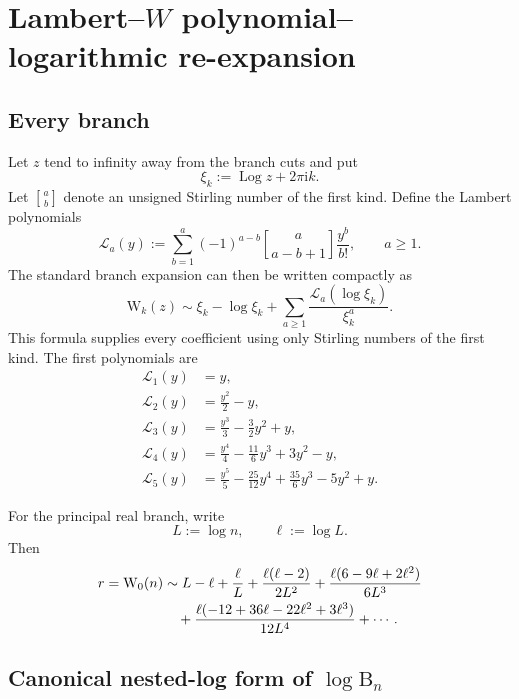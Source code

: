\documentclass[11pt,a4paper]{article}
\theoremstyle{definition}
\newcommand{\Bell}{\mathrm B}
\newcommand{\W}{\mathrm W}
\newcommand{\ii}{\mathrm i}
\newcommand{\cL}{\mathcal L}
\newcommand{\Log}{\operatorname{Log}}
\newcommand{\Sone}[2]{\genfrac{[}{]}{0pt}{}{#1}{#2}}
\begin{document}
\section{Lambert--\texorpdfstring{$W$}{W} polynomial--logarithmic re-expansion}

\subsection{Every branch}

Let $z$ tend to infinity away from the branch cuts and put
\begin{equation}\label{eq:xi-k}
 \xi_k:=\Log z+2\pi\ii k.
\end{equation}
Let $\Sone{a}{b}$ denote an unsigned Stirling number of the first
kind.  Define the Lambert polynomials
\begin{equation}\label{eq:Lambert-polynomials}
 \cL_a(y):=\sum_{b=1}^{a}(-1)^{a-b}
 \Sone{a}{a-b+1}\frac{y^b}{b!},
 \qquad a\ge1.
\end{equation}
The standard branch expansion can then be written compactly as
\begin{equation}\label{eq:W-all-branches}
 \W_k(z)\sim \xi_k-\log\xi_k
 +\sum_{a\ge1}\frac{\cL_a(\log\xi_k)}{\xi_k^a}.
\end{equation}
This formula supplies every coefficient using only Stirling numbers of the
first kind.  The first polynomials are
\begin{align*}
 \cL_1(y)&=y,\\
 \cL_2(y)&=\frac{y^2}{2}-y,\\
 \cL_3(y)&=\frac{y^3}{3}-\frac32y^2+y,\\
 \cL_4(y)&=\frac{y^4}{4}-\frac{11}{6}y^3+3y^2-y,\\
 \cL_5(y)&=\frac{y^5}{5}-\frac{25}{12}y^4
 +\frac{35}{6}y^3-5y^2+y.
\end{align*}

For the principal real branch, write
\begin{equation}\label{eq:L-ell}
 L:=\log n,\qquad \ell:=\log L.
\end{equation}
Then
\begin{align}
 r=\W_0(n)
 &\sim L-\ell+\frac{\ell}{L}
 +\frac{\ell(\ell-2)}{2L^2}
 +\frac{\ell(6-9\ell+2\ell^2)}{6L^3}\notag\\
 &\quad+\frac{\ell(-12+36\ell-22\ell^2+3\ell^3)}{12L^4}
 +\cdots.\label{eq:W-principal-expanded}
\end{align}

\subsection{Canonical nested-log form of \texorpdfstring{$\log\Bell_n$}{log Bn}}
\end{document}
